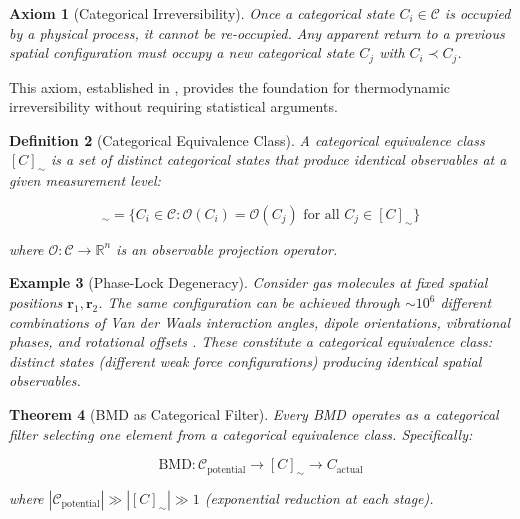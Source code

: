 \documentclass[12pt,a4paper]{article}
\newtheorem{theorem}{Theorem}[section]
\newtheorem{definition}[theorem]{Definition}
\newtheorem{axiom}[theorem]{Axiom}
\newtheorem{example}[theorem]{Example}
\begin{document}
\begin{axiom}[Categorical Irreversibility]
\label{axiom:categorical_irreversibility}
Once a categorical state $C_i \in \mathcal{C}$ is occupied by a physical process, it cannot be re-occupied. Any apparent return to a previous spatial configuration must occupy a new categorical state $C_j$ with $C_i \prec C_j$.
\end{axiom}

This axiom, established in \cite{sachikonye2024gibbs}, provides the foundation for thermodynamic irreversibility without requiring statistical arguments.

\begin{definition}[Categorical Equivalence Class]
\label{def:categorical_equivalence}
A categorical equivalence class $[C]_{\sim}$ is a set of distinct categorical states that produce identical observables at a given measurement level:

\begin{equation}
[C]_{\sim} = \{C_i \in \mathcal{C} : \mathcal{O}(C_i) = \mathcal{O}(C_j) \text{ for all } C_j \in [C]_{\sim}\}
\end{equation}

where $\mathcal{O}: \mathcal{C} \to \mathbb{R}^n$ is an observable projection operator.
\end{definition}

\begin{example}[Phase-Lock Degeneracy]
Consider gas molecules at fixed spatial positions $\mathbf{r}_1, \mathbf{r}_2$. The same configuration can be achieved through $\sim 10^6$ different combinations of Van der Waals interaction angles, dipole orientations, vibrational phases, and rotational offsets \cite{sachikonye2024gibbs}. These constitute a categorical equivalence class: distinct states (different weak force configurations) producing identical spatial observables.
\end{example}

\begin{theorem}[BMD as Categorical Filter]
\label{thm:bmd_categorical}
Every BMD operates as a categorical filter selecting one element from a categorical equivalence class. Specifically:

\begin{equation}
\text{BMD}: \mathcal{C}_{\text{potential}} \to [C]_{\sim} \to C_{\text{actual}}
\end{equation}

where $|\mathcal{C}_{\text{potential}}| \gg |[C]_{\sim}| \gg 1$ (exponential reduction at each stage).
\end{theorem}
\end{document}
